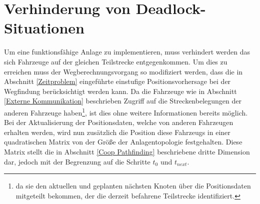 \section{Verhinderung von Deadlock-Situationen}
	\label{Deadlock Verhindern}
	Um eine funktionsfähige Anlage zu implementieren, muss verhindert werden das sich Fahrzeuge auf der gleichen Teilstrecke entgegenkommen. Um dies zu erreichen muss der Wegberechnungsvorgang so modifiziert werden, dass die in Abschnitt \ref{Zeitproblem} eingeführte einstufige Positionsvorhersage bei der Wegfindung berücksichtigt werden kann. Da die Fahrzeuge wie in Abschnitt \ref{Externe Kommunikation} beschrieben Zugriff auf die Streckenbelegungen der anderen Fahrzeuge haben\footnote{da sie den aktuellen und geplanten nächsten Knoten über die Positionsdaten mitgeteilt bekommen, der die derzeit befahrene Teilstrecke identifiziert.}, ist dies ohne weitere Informationen bereits möglich. Bei der Aktualisierung der Positionsdaten, welche von anderen Fahrzeugen erhalten werden, wird nun zusätzlich die Position diese Fahrzeugs in einer quadratischen Matrix von der Größe der Anlagentopologie festgehalten. Diese Matrix stellt die in Abschnitt \ref{Coop Pathfinding} beschriebene dritte Dimension dar, jedoch mit der Begrenzung auf die Schritte $t_0$ und $t_{next}$.

